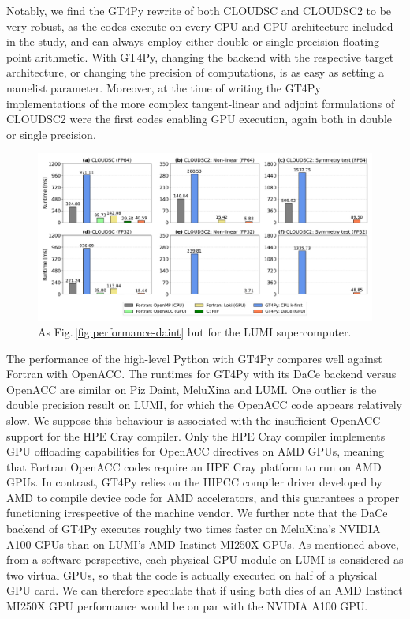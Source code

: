 \documentclass[gmd,manuscript,online]{copernicus}
\theoremstyle{theorem}
\theoremstyle{definition}
\theoremstyle{remark}
\theoremstyle{proposition}
\begin{document}
	\noindent Notably, we find the GT4Py rewrite of both CLOUDSC and CLOUDSC2 to be very robust, as the codes execute on every CPU and GPU architecture included in the study, and can always employ either double or single precision floating point arithmetic. With GT4Py, changing the backend with the respective target architecture, or changing the precision of computations, is as easy as setting a namelist parameter. Moreover, at the time of writing the GT4Py implementations of the more complex tangent-linear and adjoint formulations of CLOUDSC2 were the first codes enabling GPU execution, again both in double or single precision.

	\begin{figure}[t!]
		\centering
		\includegraphics[scale=0.44]{performance_lumi_2.pdf}
		\caption{As Fig.\,\ref{fig:performance-daint} but for the LUMI supercomputer.}
		\label{fig:performance-lumi}
	\end{figure}

	The performance of the high-level Python with GT4Py compares well against Fortran with OpenACC. The runtimes for GT4Py with its DaCe backend versus OpenACC are similar on Piz Daint, MeluXina and LUMI. One outlier is the double precision result on LUMI, for which the OpenACC code appears relatively slow. We suppose this behaviour is associated with the insufficient OpenACC support for the HPE Cray compiler. Only the HPE Cray compiler implements GPU offloading capabilities for OpenACC directives on AMD GPUs, meaning that Fortran OpenACC codes require an HPE Cray platform to run on AMD GPUs. In contrast, GT4Py relies on the HIPCC compiler driver developed by AMD to compile device code for AMD accelerators, and this guarantees a proper functioning irrespective of the machine vendor. We further note that the DaCe backend of GT4Py executes roughly two times faster on MeluXina's NVIDIA A100 GPUs than on LUMI's AMD Instinct MI250X GPUs. As mentioned above, from a software perspective, each physical GPU module on LUMI is considered as two virtual GPUs, so that the code is actually executed on half of a physical GPU card. We can therefore speculate that if using both dies of an AMD Instinct MI250X GPU performance would be on par with the NVIDIA A100 GPU.
\end{document}
